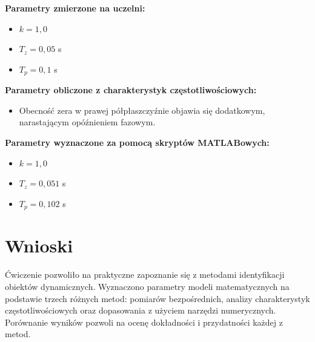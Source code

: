 \documentclass[12pt,a4paper]{article}
\begin{document}
	\noindent \textbf{Parametry zmierzone na uczelni:}
	\begin{itemize}
		\item $k = 1{,}0$ %
		\item $T_z = 0{,}05$ s %
		\item $T_p = 0{,}1$ s %
	\end{itemize}
	
	\noindent \textbf{Parametry obliczone z charakterystyk częstotliwościowych:}
	\begin{itemize}
		\item Obecność zera w prawej półpłaszczyźnie objawia się dodatkowym, narastającym opóźnieniem fazowym.
	\end{itemize}
	
	\noindent \textbf{Parametry wyznaczone za pomocą skryptów MATLABowych:}
	\begin{itemize}
		\item $k = 1{,}0$ %
		\item $T_z = 0{,}051$ s %
		\item $T_p = 0{,}102$ s %
	\end{itemize}
	
	\section{Wnioski}
	Ćwiczenie pozwoliło na praktyczne zapoznanie się z metodami identyfikacji obiektów dynamicznych. Wyznaczono parametry modeli matematycznych na podstawie trzech różnych metod: pomiarów bezpośrednich, analizy charakterystyk częstotliwościowych oraz dopasowania z użyciem narzędzi numerycznych. Porównanie wyników pozwoli na ocenę dokładności i przydatności każdej z metod.
	
\end{document}
